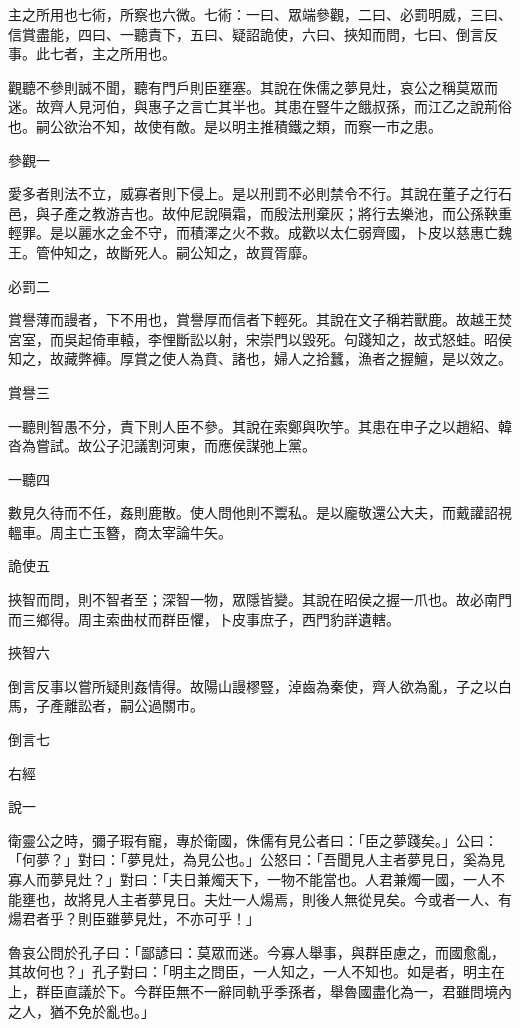 
\begin{pinyinscope}
主之所用也七術，所察也六微。七術：一曰、眾端參觀，二曰、必罰明威，三曰、信賞盡能，四曰、一聽責下，五曰、疑詔詭使，六曰、挾知而問，七曰、倒言反事。此七者，主之所用也。

觀聽不參則誠不聞，聽有門戶則臣壅塞。其說在侏儒之夢見灶，哀公之稱莫眾而迷。故齊人見河伯，與惠子之言亡其半也。其患在豎牛之餓叔孫，而江乙之說荊俗也。嗣公欲治不知，故使有敵。是以明主推積鐵之類，而察一市之患。

參觀一

愛多者則法不立，威寡者則下侵上。是以刑罰不必則禁令不行。其說在董子之行石邑，與子產之教游吉也。故仲尼說隕霜，而殷法刑棄灰；將行去樂池，而公孫鞅重輕罪。是以麗水之金不守，而積澤之火不救。成歡以太仁弱齊國，卜皮以慈惠亡魏王。管仲知之，故斷死人。嗣公知之，故買胥靡。

必罰二

賞譽薄而謾者，下不用也，賞譽厚而信者下輕死。其說在文子稱若獸鹿。故越王焚宮室，而吳起倚車轅，李悝斷訟以射，宋崇門以毀死。句踐知之，故式怒蛙。昭侯知之，故藏弊褲。厚賞之使人為賁、諸也，婦人之拾蠶，漁者之握鱣，是以效之。

賞譽三

一聽則智愚不分，責下則人臣不參。其說在索鄭與吹竽。其患在申子之以趙紹、韓沓為嘗試。故公子氾議割河東，而應侯謀弛上黨。

一聽四

數見久待而不任，姦則鹿散。使人問他則不鬻私。是以龐敬還公大夫，而戴讙詔視轀車。周主亡玉簪，商太宰論牛矢。

詭使五

挾智而問，則不智者至；深智一物，眾隱皆變。其說在昭侯之握一爪也。故必南門而三鄉得。周主索曲杖而群臣懼，卜皮事庶子，西門豹詳遺轄。

挾智六

倒言反事以嘗所疑則姦情得。故陽山謾樛豎，淖齒為秦使，齊人欲為亂，子之以白馬，子產離訟者，嗣公過關市。

倒言七

右經

說一

衛靈公之時，彌子瑕有寵，專於衛國，侏儒有見公者曰：「臣之夢踐矣。」公曰：「何夢？」對曰：「夢見灶，為見公也。」公怒曰：「吾聞見人主者夢見日，奚為見寡人而夢見灶？」對曰：「夫日兼燭天下，一物不能當也。人君兼燭一國，一人不能壅也，故將見人主者夢見日。夫灶一人煬焉，則後人無從見矣。今或者一人、有煬君者乎？則臣雖夢見灶，不亦可乎！」

魯哀公問於孔子曰：「鄙諺曰：莫眾而迷。今寡人舉事，與群臣慮之，而國愈亂，其故何也？」孔子對曰：「明主之問臣，一人知之，一人不知也。如是者，明主在上，群臣直議於下。今群臣無不一辭同軌乎季孫者，舉魯國盡化為一，君雖問境內之人，猶不免於亂也。」


\end{pinyinscope}
